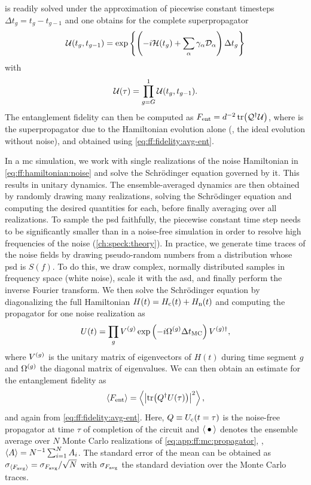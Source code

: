  is readily solved under the approximation of piecewise constant timesteps $\Delta t_g = t_{g} - t_{g-1}$ and one obtains for the complete superpropagator
\begin{equation}\label{eq:app:ff:lindblad:propagator}
    \mathcal{U}(t_{g}, t_{g-1}) = \exp\left\{ \left(-i\mathcal{H}(t_g) + \sum_\alpha\gamma_\alpha\mathcal{D}_\alpha\right) \Delta t_g \right\}
\end{equation}
with
\begin{equation}
    \mathcal{U}(\tau) = \prod_{g=G}^1\mathcal{U}(t_{g}, t_{g-1}).
\end{equation}
The entanglement fidelity can then be computed as $F_{\mathrm{ent}} = d^{-2}\tr(\mathcal{Q}^\dagger\mathcal{U})$, where \liouvQ is the superpropagator due to the Hamiltonian evolution alone (\ie, the ideal evolution without noise), and \avgfid obtained using \cref{eq:ff:fidelity:avg-ent}.

In a \gls{mc} simulation, we work with single realizations of the noise Hamiltonian in \cref{eq:ff:hamiltonian:noise} and solve the Schrödinger equation governed by it.
This results in unitary dynamics.
The ensemble-averaged dynamics are then obtained by randomly drawing many realizations, solving the Schrödinger equation and computing the desired quantities for each, before finally averaging over all realizations.
To sample the \gls{psd} faithfully, the piecewise constant time step needs to be significantly smaller than in a noise-free simulation in order to resolve high frequencies of the noise (\cf \cref{ch:speck:theory}).
In practice, we generate time traces of the noise fields by drawing pseudo-random numbers from a distribution whose \gls{psd} is $S(f)$.
To do this, we draw complex, normally distributed samples in frequency space (\ie white noise), scale it with the \gls{asd}, and finally perform the inverse Fourier transform.
We then solve the Schrödinger equation by diagonalizing the full Hamiltonian $H(t) = H_{\mathrm{c}}(t) + H_{\mathrm{n}}(t)$ and computing the propagator for one noise realization as
\begin{equation}\label{eq:app:ff:mc:propagator}
    U(t) = \prod_g V^{(g)}\exp\left(-i\Omega^{(g)}\Delta t_{\mathrm{MC}}\right) V^{(g)\dagger},
\end{equation}
where $V^{(g)}$ is the unitary matrix of eigenvectors of $H(t)$ during time segment $g$ and $\Omega^{(g)}$ the diagonal matrix of eigenvalues.
We can then obtain an estimate for the entanglement fidelity \entfid as
\begin{equation}
    \ev{\entfid} = \ev{\abs{\tr(Q\adjoint U(\tau))}^2},
\end{equation}
and \avgfid again from \cref{eq:ff:fidelity:avg-ent}.
Here, $Q\equiv U_{\mathrm{c}}(t=\tau)$ is the noise-free propagator at time $\tau$ of completion of the circuit and $\ev{\placeholder}$ denotes the ensemble average over $N$ Monte Carlo realizations of \cref{eq:app:ff:mc:propagator}, \ie, $\ev{A}=N\inverse\sum_{i=1}^N A_i$.
The standard error of the mean can be obtained as $\sigma_{\ev{\avgfid}} = \sigma_{\avgfid} / \sqrt{N}$ with $\sigma_{F_{\mathrm{avg}}}$ the standard deviation over the Monte Carlo traces.

